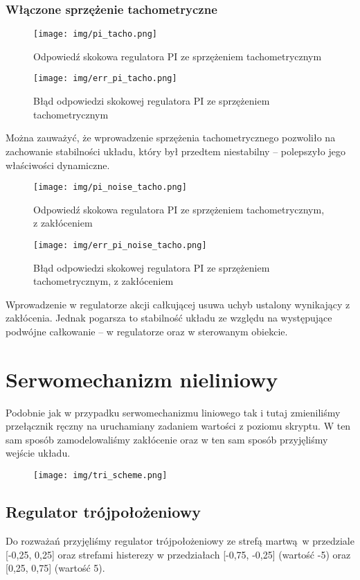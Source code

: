 \documentclass[a4paper, 12pt, titlepage]{article}
\begin{document}
			\subsubsection{Włączone sprzężenie tachometryczne}
				\begin{figure}[H]
					\centering
					\texttt{[image: img/pi\_tacho.png]}
					\caption{Odpowiedź skokowa regulatora PI ze sprzężeniem tachometrycznym}
				\end{figure}
				\begin{figure}[H]
					\centering
					\texttt{[image: img/err\_pi\_tacho.png]}
					\caption{Błąd odpowiedzi skokowej regulatora PI ze sprzężeniem tachometrycznym}
				\end{figure}
				Można zauważyć, że wprowadzenie sprzężenia tachometrycznego pozwoliło na zachowanie stabilności układu, który był przedtem niestabilny -- polepszyło jego właściwości dynamiczne.
				\begin{figure}[H]
					\centering
					\texttt{[image: img/pi\_noise\_tacho.png]}
					\caption{Odpowiedź skokowa regulatora PI ze sprzężeniem tachometrycznym, z zakłóceniem}
				\end{figure}
				\begin{figure}[H]
					\centering
					\texttt{[image: img/err\_pi\_noise\_tacho.png]}
					\caption{Błąd odpowiedzi skokowej regulatora PI ze sprzężeniem tachometrycznym, z zakłóceniem}
				\end{figure} \noindent
				Wprowadzenie w regulatorze akcji całkującej usuwa uchyb ustalony wynikający z zakłócenia. Jednak pogarsza to stabilność układu ze względu na występujące podwójne całkowanie -- w regulatorze oraz w sterowanym obiekcie.
	\newpage
	\section{Serwomechanizm nieliniowy}
		Podobnie jak w przypadku serwomechanizmu liniowego tak i tutaj zmieniliśmy przełącznik ręczny na uruchamiany zadaniem wartości z poziomu skryptu. W ten sam sposób zamodelowaliśmy zakłócenie oraz w ten sam sposób przyjęliśmy wejście układu.
		\begin{figure}[H]
			\centering
			\texttt{[image: img/tri\_scheme.png]}
		\end{figure}
		\subsection{Regulator trójpołożeniowy}
			Do rozważań przyjęliśmy regulator trójpołożeniowy ze strefą martwą w przedziale [-0,25, 0,25] oraz strefami histerezy w przedziałach [-0,75, -0,25] (wartość -5) oraz [0,25, 0,75] (wartość 5).
\end{document}
